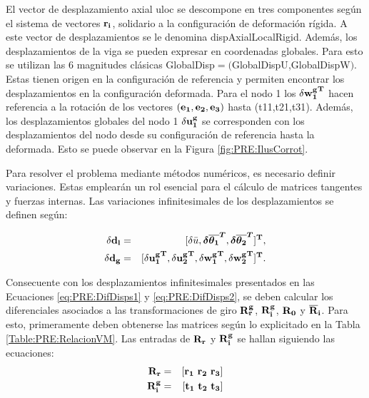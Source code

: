 El vector de desplazamiento axial \gls{uloc} se descompone en tres componentes según el sistema de vectores $\bf{r_i}$, solidario a la configuración de deformación rígida. A este vector de desplazamientos se le denomina \gls{dispAxialLocalRigid}. Además, los desplazamientos de la viga se pueden expresar en coordenadas globales.  Para esto se utilizan las 6 magnitudes clásicas \gls{GlobalDisp}$=($\gls{GlobalDispU},\gls{GlobalDispW}$)$. Estas tienen origen en la configuración de referencia y permiten encontrar los desplazamientos en la configuración deformada. Para el nodo 1 los $\bf{\delta{w_1^g}^T}$ hacen referencia a la rotación de los vectores $(\bf{e_1},\bf{e_2},\bf{e_3})$ hasta (\gls{t11},\gls{t21},\gls{t31}). Además, los desplazamientos globales del nodo 1 $\bf{\delta u_1^g}$ se corresponden con los desplazamientos del nodo desde su configuración de referencia hasta la deformada. Esto se puede observar en la Figura \ref{fig:PRE:IlusCorrot}.
%	

Para resolver el problema mediante métodos numéricos, es necesario definir variaciones. Estas emplearán un rol esencial para el cálculo de matrices tangentes y fuerzas internas. Las variaciones infinitesimales de los desplazamientos se definen según:

\begin{eqnarray}\label{eq:PRE:DifDisps1}
		\bf{\delta d_l} &=& [\delta\bar{u}, \boldsymbol{\delta\overline{ \theta _1}^T},	\boldsymbol{\delta \overline{ \theta _2}^T}]^{\bf{T}},\\
	\label{eq:PRE:DifDisps2}
	\bf{\delta d_g} &=& [\bf{\delta u_1^g}^T, \bf{\delta u_2^g}^T, \bf{\delta{w_1^g}^T}, \bf{\delta{w_2^g}^T}]^T.
\end{eqnarray}

Consecuente con los desplazamientos infinitesimales presentados en las Ecuaciones \eqref{eq:PRE:DifDisps1} y \eqref{eq:PRE:DifDisps2}, se deben calcular los diferenciales asociados a las transformaciones de giro $\bf{R_r^g}$, $\bf{R_i^g}$, $\bf{R_0}$ y $\bf{\overline{R}}_i$.
Para esto, primeramente deben obtenerse las matrices según lo explicitado en la Tabla \ref{Table:PRE:RelacionVM}. Las entradas de $\bf{R}_r$ y  $\bf{R}_i^g$ se hallan siguiendo las ecuaciones:
\begin{eqnarray}
	\label{eq:PRE:Rr}
	\bf{R_r}&=&[\bf{r_1} ~ \bf{r_2} ~ \bf{r_3}]\\
	\label{eq:PRE:Rg}
	\bf{R}_i^g&=&[\bf{t_1} ~ \bf{t_2} ~ \bf{t_3}]
\end{eqnarray}

